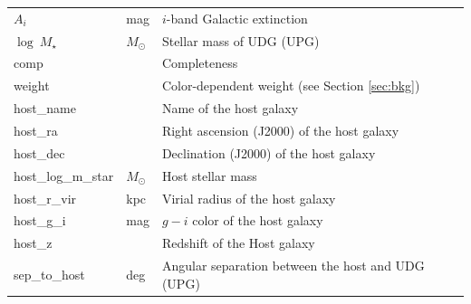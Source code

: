 \documentclass[twocolumn,astrosymb,twocolappendix]{aastex631}
\begin{document}
\begin{CJK*}{UTF8}{gbsn}
\begin{table}
\begin{center}
\begin{tabular}{l l l}
$A_i$                    & mag     & $i$-band Galactic extinction \\
$\log\ M_\star$ & $M_\odot$ & Stellar mass of UDG (UPG) \\
comp & & Completeness \\
weight & & Color-dependent weight (see Section \ref{sec:bkg}) \\
host\_name & & Name of the host galaxy \\
host\_ra & & Right ascension (J2000) of the host galaxy \\
host\_dec & & Declination (J2000) of the host galaxy \\
host\_log\_m\_star & $M_\odot$ & Host stellar mass\\
host\_r\_vir & kpc & Virial radius of the host galaxy \\
host\_g\_i & mag & $g-i$ color of the host galaxy \\
host\_z &  & Redshift of the Host galaxy \\
sep\_to\_host & deg & Angular separation between the host and UDG (UPG)\\
\hline\hline
\end{tabular}
\end{center}
\end{table}

\end{CJK*}
\end{document}
